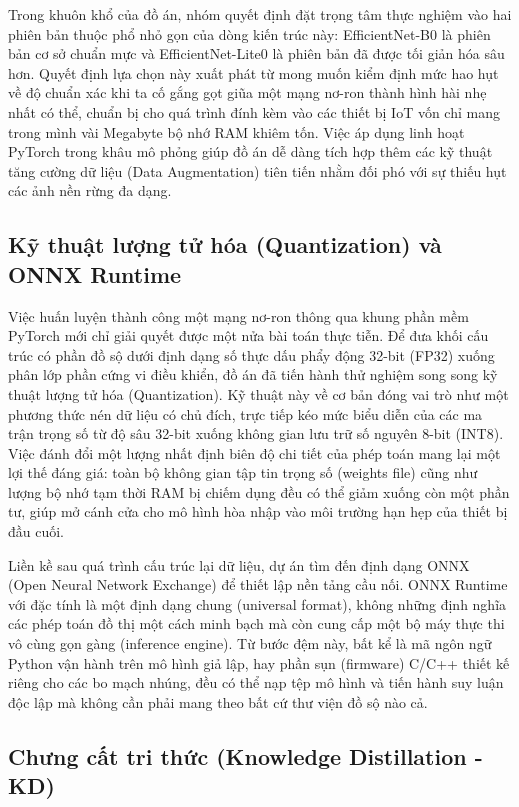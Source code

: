 \documentclass[12pt,a4paper]{report}
\begin{document}
Trong khuôn khổ của đồ án, nhóm quyết định đặt trọng tâm thực nghiệm vào hai phiên bản thuộc phổ nhỏ gọn của dòng kiến trúc này: EfficientNet-B0 là phiên bản cơ sở chuẩn mực và EfficientNet-Lite0 là phiên bản đã được tối giản hóa sâu hơn. Quyết định lựa chọn này xuất phát từ mong muốn kiểm định mức hao hụt về độ chuẩn xác khi ta cố gắng gọt giũa một mạng nơ-ron thành hình hài nhẹ nhất có thể, chuẩn bị cho quá trình đính kèm vào các thiết bị IoT vốn chỉ mang trong mình vài Megabyte bộ nhớ RAM khiêm tốn. Việc áp dụng linh hoạt PyTorch trong khâu mô phỏng giúp đồ án dễ dàng tích hợp thêm các kỹ thuật tăng cường dữ liệu (Data Augmentation) tiên tiến nhằm đối phó với sự thiếu hụt các ảnh nền rừng đa dạng. 

\subsection{Kỹ thuật lượng tử hóa (Quantization) và ONNX Runtime}

Việc huấn luyện thành công một mạng nơ-ron thông qua khung phần mềm PyTorch mới chỉ giải quyết được một nửa bài toán thực tiễn. Để đưa khối cấu trúc có phần đồ sộ dưới định dạng số thực dấu phẩy động 32-bit (FP32) xuống phân lớp phần cứng vi điều khiển, đồ án đã tiến hành thử nghiệm song song kỹ thuật lượng tử hóa (Quantization). Kỹ thuật này về cơ bản đóng vai trò như một phương thức nén dữ liệu có chủ đích, trực tiếp kéo mức biểu diễn của các ma trận trọng số từ độ sâu 32-bit xuống không gian lưu trữ số nguyên 8-bit (INT8). Việc đánh đổi một lượng nhất định biên độ chi tiết của phép toán mang lại một lợi thế đáng giá: toàn bộ không gian tập tin trọng số (weights file) cũng như lượng bộ nhớ tạm thời RAM bị chiếm dụng đều có thể giảm xuống còn một phần tư, giúp mở cánh cửa cho mô hình hòa nhập vào môi trường hạn hẹp của thiết bị đầu cuối. 

Liền kề sau quá trình cấu trúc lại dữ liệu, dự án tìm đến định dạng ONNX (Open Neural Network Exchange) \cite{onnxruntime} để thiết lập nền tảng cầu nối. ONNX Runtime với đặc tính là một định dạng chung (universal format), không những định nghĩa các phép toán đồ thị một cách minh bạch mà còn cung cấp một bộ máy thực thi vô cùng gọn gàng (inference engine). Từ bước đệm này, bất kể là mã ngôn ngữ Python vận hành trên mô hình giả lập, hay phần sụn (firmware) C/C++ thiết kế riêng cho các bo mạch nhúng, đều có thể nạp tệp mô hình và tiến hành suy luận độc lập mà không cần phải mang theo bất cứ thư viện đồ sộ nào cả.

\subsection{Chưng cất tri thức (Knowledge Distillation - KD)}
\end{document}
